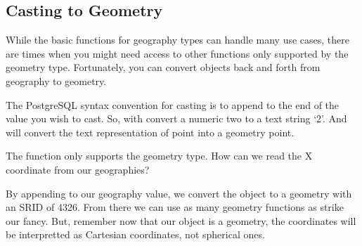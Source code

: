 \documentclass[a4paper,11pt,english]{sphinxmanual}
\begin{document}
\subsection{Casting to Geometry}
\label{\detokenize{basic:casting-to-geometry}}
While the basic functions for geography types can handle many use cases, there are times when you might need access to other functions only supported by the geometry type. Fortunately, you can convert objects back and forth from geography to geometry.

The PostgreSQL syntax convention for casting is to append  to the end of the value you wish to cast. So,  with convert a numeric two to a text string ‘2’. And  will convert the text representation of point into a geometry point.

The  function only supports the geometry type. How can we read the X coordinate from our geographies?

\begin{sphinxVerbatim}[commandchars=\\\{\}]
      
\end{sphinxVerbatim}

\begin{sphinxVerbatim}[commandchars=\\\{\}]
   
    
       
     
\end{sphinxVerbatim}

By appending  to our geography value, we convert the object to a geometry with an SRID of 4326. From there we can use as many geometry functions as strike our fancy. But, remember \textendash{} now that our object is a geometry, the coordinates will be interpretted as Cartesian coordinates, not spherical ones.
\end{document}
